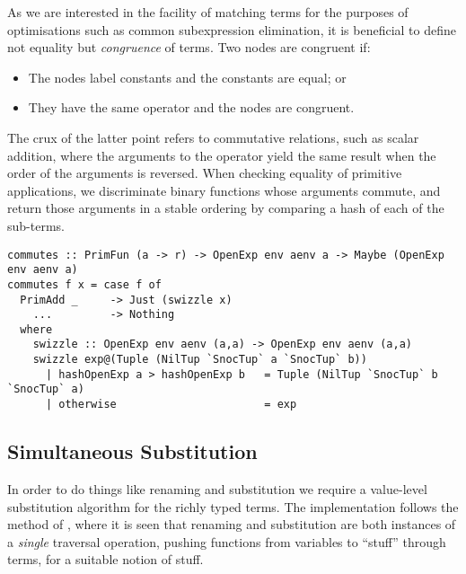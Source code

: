 As we are interested in the facility of matching terms for the purposes of
optimisations such as common subexpression elimination, it is beneficial to
define not equality but \emph{congruence} of terms. Two nodes are congruent if:
%
\begin{itemize}
    \item The nodes label constants and the constants are equal; or
    \item They have the same operator and the nodes are congruent.
\end{itemize}
%
The crux of the latter point refers to commutative relations, such as scalar
addition, where the arguments to the operator yield the same result when the
order of the arguments is reversed. When checking equality of primitive
applications, we discriminate binary functions whose arguments commute, and
return those arguments in a stable ordering by comparing a hash of each of the
sub-terms.
%
%
\begin{lstlisting}[style=haskell]
commutes :: PrimFun (a -> r) -> OpenExp env aenv a -> Maybe (OpenExp env aenv a)
commutes f x = case f of
  PrimAdd _     -> Just (swizzle x)
    ...         -> Nothing
  where
    swizzle :: OpenExp env aenv (a,a) -> OpenExp env aenv (a,a)
    swizzle exp@(Tuple (NilTup `SnocTup` a `SnocTup` b))
      | hashOpenExp a > hashOpenExp b   = Tuple (NilTup `SnocTup` b `SnocTup` a)
      | otherwise                       = exp
\end{lstlisting}
%


\subsection{Simultaneous Substitution}
\label{sec:substitution}

In order to do things like renaming
and substitution
we require a value-level substitution algorithm for the richly typed terms. The
implementation follows the method of \citet{McBride:2006,McBride:2005}, where it
is seen that renaming and substitution are both instances of a \emph{single}
traversal operation, pushing functions from variables to ``stuff'' through
terms, for a suitable notion of stuff.

